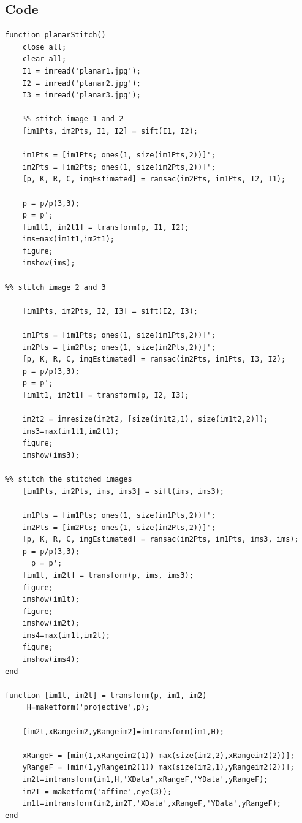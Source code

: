 \documentclass[12pt]{article}
\begin{document}
\subsection{Code}
\begin{lstlisting}
function planarStitch()
    close all;
    clear all;
    I1 = imread('planar1.jpg');
    I2 = imread('planar2.jpg');
    I3 = imread('planar3.jpg');
    
    %% stitch image 1 and 2
    [im1Pts, im2Pts, I1, I2] = sift(I1, I2);

    im1Pts = [im1Pts; ones(1, size(im1Pts,2))]';
    im2Pts = [im2Pts; ones(1, size(im2Pts,2))]';
    [p, K, R, C, imgEstimated] = ransac(im2Pts, im1Pts, I2, I1);

    p = p/p(3,3);
    p = p';
    [im1t1, im2t1] = transform(p, I1, I2);
    ims=max(im1t1,im2t1);
    figure;
    imshow(ims);

%% stitch image 2 and 3

    [im1Pts, im2Pts, I2, I3] = sift(I2, I3);

    im1Pts = [im1Pts; ones(1, size(im1Pts,2))]';
    im2Pts = [im2Pts; ones(1, size(im2Pts,2))]';
    [p, K, R, C, imgEstimated] = ransac(im2Pts, im1Pts, I3, I2);
    p = p/p(3,3);
    p = p';
    [im1t1, im2t1] = transform(p, I2, I3);

    im2t2 = imresize(im2t2, [size(im1t2,1), size(im1t2,2)]);
    ims3=max(im1t1,im2t1);
    figure;
    imshow(ims3);

%% stitch the stitched images
    [im1Pts, im2Pts, ims, ims3] = sift(ims, ims3);
   
    im1Pts = [im1Pts; ones(1, size(im1Pts,2))]';
    im2Pts = [im2Pts; ones(1, size(im2Pts,2))]';
    [p, K, R, C, imgEstimated] = ransac(im2Pts, im1Pts, ims3, ims);
    p = p/p(3,3);
      p = p';
    [im1t, im2t] = transform(p, ims, ims3); 
    figure;
    imshow(im1t);
    figure;
    imshow(im2t);
    ims4=max(im1t,im2t);
    figure;
    imshow(ims4);
end

function [im1t, im2t] = transform(p, im1, im2)
     H=maketform('projective',p);

    [im2t,xRangeim2,yRangeim2]=imtransform(im1,H);

    xRangeF = [min(1,xRangeim2(1)) max(size(im2,2),xRangeim2(2))];
    yRangeF = [min(1,yRangeim2(1)) max(size(im2,1),yRangeim2(2))];
    im2t=imtransform(im1,H,'XData',xRangeF,'YData',yRangeF);
    im2T = maketform('affine',eye(3));
    im1t=imtransform(im2,im2T,'XData',xRangeF,'YData',yRangeF);
end
\end{lstlisting}
\end{document}
